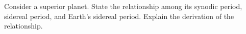 \documentclass[main.tex]{subfiles}
\begin{document}
\begin{q}{2}
Consider a superior planet. State the relationship among its synodic period, sidereal period, and Earth's sidereal period. Explain the derivation of the relationship.
\end{q}

\begin{sol}

\end{sol}
\end{document}
